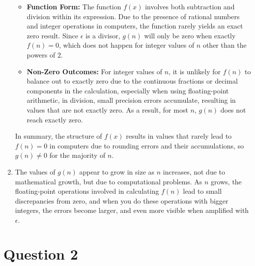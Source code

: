 \documentclass[11pt,a4paper, margin=1in]{article}
\begin{document}
\begin{enumerate}
    \begin{itemize}
        \item \textbf{Function Form:} The function \( f(x) \) involves both subtraction and division within its expression. Due to the presence of rational numbers and integer operations in computers, the function rarely yields an exact zero result. Since \( \epsilon \) is a divisor, \( g(n) \) will only be zero when exactly \( f(n) = 0 \), which does not happen for integer values of \( n \) other than the powers of 2.
        \item \textbf{Non-Zero Outcomes:} For integer values of \( n \), it is unlikely for \( f(n) \) to balance out to exactly zero due to the continuous fractions or decimal components in the calculation, especially when using floating-point arithmetic, in division, small precision errors accumulate, resulting in values that are not exactly zero. As a result, for most \( n \), \( g(n) \) does not reach exactly zero.
    \end{itemize}

    In summary, the structure of \( f(x) \) results in values that rarely lead to \( f(n) = 0 \) in computers due to rounding errors and their accumulations, so \( g(n) \neq 0 \) for the majority of \( n \).
    
    \item The values of \( g(n) \) appear to grow in size as \( n \) increases, not due to mathematical growth, but due to computational problems. 
    As \( n \) grows, the floating-point operations involved in calculating \( f(n) \) lead to small discrepancies from zero, and when you do these operations with bigger integers, the errors become larger, and even more visible when amplified with \(\epsilon\).

\end{enumerate}

\section*{Question 2}
\end{document}
